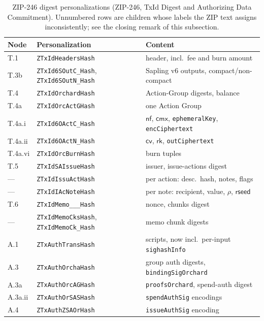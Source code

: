 \documentclass[11pt,a4paper]{article}
\theoremstyle{definition}
\newcommand{\nfsym}{\mathsf{nf}}
\newcommand{\cmx}{\mathsf{cmx}}
\newcommand{\cvsym}{\mathsf{cv}}
\newcommand{\rk}{\mathsf{rk}}
\begin{document}
\begin{table}[htbp]
\centering\small
\begin{tabular}{@{}lll@{}}
\toprule
Node & Personalization & Content \\
\midrule
T.1 & \texttt{ZTxIdHeadersHash} & header, incl.\ fee and burn amount \\
T.3b & \texttt{ZTxId6SOutC\_Hash}, \texttt{ZTxId6SOutN\_Hash}
  & Sapling v6 outputs, compact/non-compact \\
T.4 & \texttt{ZTxIdOrchardHash} & Action-Group digests, balance \\
T.4a & \texttt{ZTxIdOrcActGHash} & one Action Group \\
T.4a.i & \texttt{ZTxId6OActC\_Hash}
  & $\nfsym$, $\cmx$, \texttt{ephemeralKey}, \texttt{encCiphertext} \\
T.4a.ii & \texttt{ZTxId6OActN\_Hash}
  & $\cvsym$, $\rk$, \texttt{outCiphertext} \\
T.4a.vi & \texttt{ZTxIdOrcBurnHash} & burn tuples \\
T.5 & \texttt{ZTxIdSAIssueHash} & issuer, issue-actions digest \\
--- & \texttt{ZTxIdIssuActHash} & per action: desc.\ hash, notes, flags \\
--- & \texttt{ZTxIdIAcNoteHash}
  & per note: recipient, value, $\rho$, $\mathsf{rseed}$ \\
T.6 & \texttt{ZTxIdMemo\_\_\_Hash} & nonce, chunks digest \\
--- & \texttt{ZTxIdMemoCksHash}, \texttt{ZTxIdMemoCk\_Hash}
  & memo chunk digests \\
\midrule
A.1 & \texttt{ZTxAuthTransHash}
  & scripts, now incl.\ per-input \texttt{sighashInfo} \\
A.3 & \texttt{ZTxAuthOrchaHash}
  & group auth digests, \texttt{bindingSigOrchard} \\
A.3a & \texttt{ZTxAuthOrcAGHash} & \texttt{proofsOrchard}, spend-auth digest \\
A.3a.ii & \texttt{ZTxAuthOrSASHash} & \texttt{spendAuthSig} encodings \\
A.4 & \texttt{ZTxAuthZSAOrHash} & \texttt{issueAuthSig} encoding \\
\bottomrule
\end{tabular}
\caption{ZIP-246 digest personalizations (ZIP-246, TxId Digest and
Authorizing Data Commitment). Unnumbered rows are children whose labels the
ZIP text assigns inconsistently; see the closing remark of this
subsection.}
\label{tab:zsa-personalizations}
\end{table}
\end{document}
